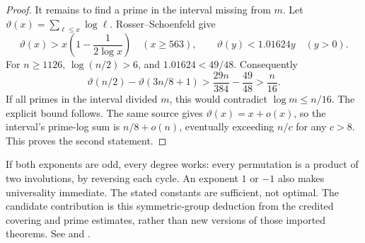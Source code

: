 \begin{proof}
It remains to find a prime in the interval missing from \(m\).
Let \(\vartheta(x)=\sum_{\ell\le x}\log\ell\).
Rosser--Schoenfeld \cite[Theorem~4, (3.14), and Theorem~9]{rosser-schoenfeld} give
\[
 \vartheta(x)>x\left(1-\frac1{2\log x}\right)\quad(x\ge563),
 \qquad \vartheta(y)<1.01624y\quad(y>0).
\]
For \(n\ge1126\), \(\log(n/2)>6\), and \(1.01624<49/48\).
Consequently
\[
 \vartheta(n/2)-\vartheta(3n/8+1)
 >\frac{29n}{384}-\frac{49}{48}>\frac n{16}.
\]
If all primes in the interval divided \(m\), this would contradict
\(\log m\le n/16\). The explicit bound follows.
The same source gives \(\vartheta(x)=x+o(x)\), so the interval's
prime-log sum is \(n/8+o(n)\), eventually exceeding \(n/c\)
for any \(c>8\). This proves the second statement.
\end{proof}

If both exponents are odd, every degree works: every permutation is
a product of two involutions, by reversing each cycle.
An exponent \(1\) or \(-1\) also makes universality immediate.
The stated constants are sufficient, not optimal.
The candidate contribution is this symmetric-group deduction from
the credited covering and prime estimates, rather than new versions
of those imported theorems.
See  and
.
